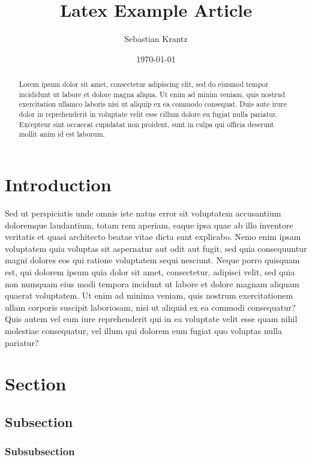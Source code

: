 \documentclass[a4paper]{article}
\title{\textbf{Latex Example Article}}
\author{Sebastian Krantz}
\date{\today}
\begin{document}
\maketitle

\begin{abstract}
Lorem ipsum dolor sit amet, consectetur adipiscing elit, sed do eiusmod tempor incididunt ut labore et dolore magna aliqua. Ut enim ad minim veniam, quis nostrud exercitation ullamco laboris nisi ut aliquip ex ea commodo consequat. Duis aute irure dolor in reprehenderit in voluptate velit esse cillum dolore eu fugiat nulla pariatur. Excepteur sint occaecat cupidatat non proident, sunt in culpa qui officia deserunt mollit anim id est laborum.
\end{abstract}

\tableofcontents
\listoftables
\listoffigures


\newpage %

\section{Introduction}
Sed ut perspiciatis unde omnis iste natus error sit voluptatem accusantium doloremque laudantium, totam rem aperiam, eaque ipsa quae ab illo inventore veritatis et quasi architecto beatae vitae dicta sunt explicabo. Nemo enim ipsam voluptatem quia voluptas sit aspernatur aut odit aut fugit, sed quia consequuntur magni dolores eos qui ratione voluptatem sequi nesciunt. Neque porro quisquam est, qui dolorem ipsum quia dolor sit amet, consectetur, adipisci velit, sed quia non numquam eius modi tempora incidunt ut labore et dolore magnam aliquam quaerat voluptatem. Ut enim ad minima veniam, quis nostrum exercitationem ullam corporis suscipit laboriosam, nisi ut aliquid ex ea commodi consequatur? Quis autem vel eum iure reprehenderit qui in ea voluptate velit esse quam nihil molestiae consequatur, vel illum qui dolorem eum fugiat quo voluptas nulla pariatur?

\section{Section} 
\subsection{Subsection}
\subsubsection{Subsubsection}
\end{document}
